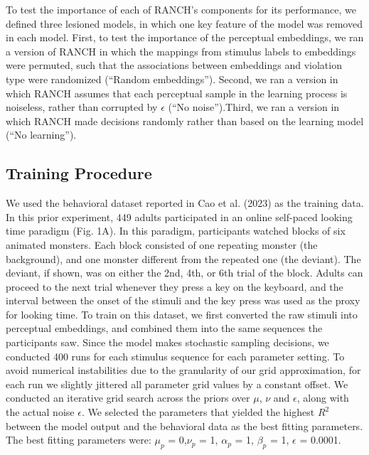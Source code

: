 \documentclass[10pt, letterpaper]{article}
\begin{document}
To test the importance of each of RANCH's components for its
performance, we defined three lesioned models, in which one key feature
of the model was removed in each model. First, to test the importance of
the perceptual embeddings, we ran a version of RANCH in which the
mappings from stimulus labels to embeddings were permuted, such that the
associations between embeddings and violation type were randomized
(``Random embeddings''). Second, we ran a version in which RANCH assumes
that each perceptual sample in the learning process is noiseless, rather
than corrupted by \(\epsilon\) (``No noise'').Third, we ran a version in
which RANCH made decisions randomly rather than based on the learning
model (``No learning'').

\hypertarget{training-procedure}{%
\subsection{Training Procedure}\label{training-procedure}}

We used the behavioral dataset reported in Cao et al. (2023) as the
training data. In this prior experiment, 449 adults participated in an
online self-paced looking time paradigm (Fig. 1A). In this paradigm,
participants watched blocks of six animated monsters. Each block
consisted of one repeating monster (the background), and one monster
different from the repeated one (the deviant). The deviant, if shown,
was on either the 2nd, 4th, or 6th trial of the block. Adults can
proceed to the next trial whenever they press a key on the keyboard, and
the interval between the onset of the stimuli and the key press was used
as the proxy for looking time. To train on this dataset, we first
converted the raw stimuli into perceptual embeddings, and combined them
into the same sequences the participants saw. Since the model makes
stochastic sampling decisions, we conducted 400 runs for each stimulus
sequence for each parameter setting. To avoid numerical instabilities
due to the granularity of our grid approximation, for each run we
slightly jittered all parameter grid values by a constant offset. We
conducted an iterative grid search across the priors over \(\mu\),
\(\nu\) and \(\epsilon\), along with the actual noise \(\epsilon\). We
selected the parameters that yielded the highest \(R^2\) between the
model output and the behavioral data as the best fitting parameters. The
best fitting parameters were: \(\mu_{p}\) = 0,\(\nu_{p}\) = 1,
\(\alpha_{p}\) = 1, \(\beta_{p}\) = 1, \(\epsilon\) = 0.0001.
\end{document}
